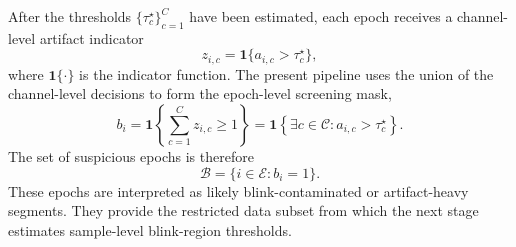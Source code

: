 After the thresholds \(\{\tau_c^\star\}_{c=1}^{C}\) have been estimated, each
epoch receives a channel-level artifact indicator
\[
z_{i,c}
= \mathbf{1}\{a_{i,c} > \tau_c^\star\},
\]
where \(\mathbf{1}\{\cdot\}\) is the indicator function. The present pipeline
uses the union of the channel-level decisions to form the epoch-level screening
mask,
\[
b_i
= \mathbf{1}\left\{\sum_{c=1}^{C} z_{i,c} \geq 1\right\}
= \mathbf{1}\left\{\exists c \in \mathcal{C}: a_{i,c} > \tau_c^\star\right\}.
\]
The set of suspicious epochs is therefore
\[
\mathcal{B}=\{i \in \mathcal{E}: b_i=1\}.
\]
These epochs are interpreted as likely blink-contaminated or artifact-heavy
segments. They provide the restricted data subset from which the next stage
estimates sample-level blink-region thresholds.
